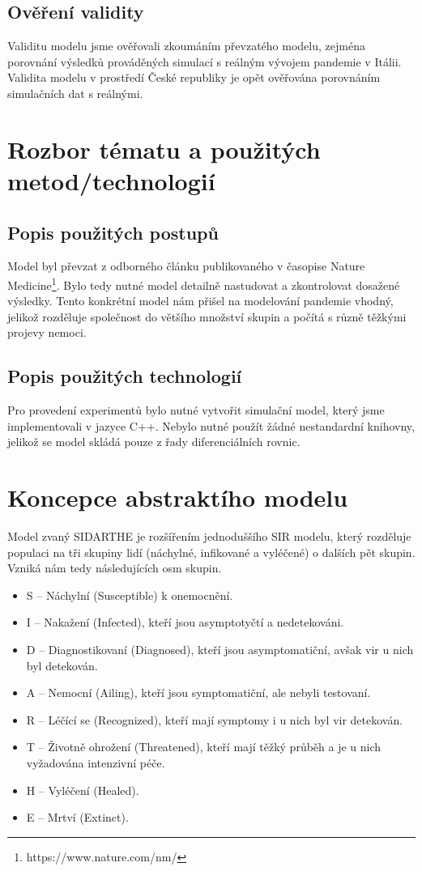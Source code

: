\documentclass[a4paper,11pt]{article}
\begin{document}
	\subsection{Ověření validity}
	Validitu modelu jsme ověřovali zkoumáním převzatého modelu, zejména porovnání výsledků prováděných simulací s reálným vývojem pandemie v Itálii. Validita modelu v prostředí České republiky je opět ověřována porovnáním simulačních dat s reálnými.
	
	\section{Rozbor tématu a použitých metod/technologií}
	
	\subsection{Popis použitých postupů}
		Model byl převzat z odborného článku \cite{source} publikovaného v časopise Nature Medicine\footnote{https://www.nature.com/nm/}. Bylo tedy nutné model detailně nastudovat a zkontrolovat dosažené výsledky. Tento konkrétní model nám přišel na modelování pandemie vhodný, jelikož rozděluje společnost do většího množství skupin a počítá s různě těžkými projevy nemoci.
	
	\subsection{Popis použitých technologií}
		Pro provedení experimentů bylo nutné vytvořit simulační model, který jsme implementovali v jazyce C++. Nebylo nutné použít žádné nestandardní knihovny, jelikož se model skládá pouze z řady diferenciálních rovnic.
			
	\section{Koncepce abstraktího modelu}
		Model zvaný SIDARTHE je rozšířením jednoduššího SIR modelu, který rozděluje populaci na tři skupiny lidí (náchylné, infikované a vyléčené) o dalších pět skupin. Vzniká nám tedy následujících osm skupin.
		
		\begin{itemize}
			\item S -- Náchylní (Susceptible) k onemocnění.
			\item I -- Nakažení (Infected), kteří jsou asymptotyčtí a nedetekováni.
			\item D -- Diagnostikovaní (Diagnosed), kteří jsou asymptomatiční, avšak vir u nich byl detekován.
			\item A -- Nemocní (Ailing), kteří jsou symptomatiční, ale nebyli testovaní.
			\item R -- Léčící se (Recognized), kteří mají symptomy i u nich byl vir detekován.
			\item T -- Životně ohrožení (Threatened), kteří mají těžký průběh a je u nich vyžadována intenzivní péče.
			\item H -- Vyléčení (Healed).
			\item E -- Mrtví (Extinct).
		\end{itemize}
	
\end{document}
